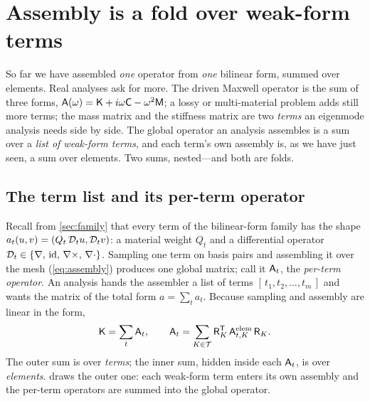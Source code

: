 \section{Assembly is a fold over weak-form terms}
\label{sec:fold}

So far we have assembled \emph{one} operator from \emph{one} bilinear form, summed
over elements. Real analyses ask for more. The driven Maxwell operator is the sum
of three forms, $\mathsf{A}(\omega)=\mathsf{K}+i\omega\mathsf{C}-\omega^2\mathsf{M}$; a lossy
or multi-material problem adds still more terms; the mass matrix and the stiffness
matrix are two \emph{terms} an eigenmode analysis needs side by side. The global
operator an analysis assembles is a sum over a \emph{list of weak-form terms},
and each term's own assembly is, as we have just seen, a sum over elements. Two
sums, nested---and both are folds.

\subsection{The term list and its per-term operator}

Recall from \cref{sec:family} that every term of the bilinear-form family has the
shape $a_t(u,v)=(Q_t\,\mathcal{D}_t u,\mathcal{D}_t v)$: a material weight $Q_t$ and a
differential operator $\mathcal{D}_t\in\{\nabla,\,\mathrm{id},\,\nabla\times,\,\nabla\cdot\}$.
Sampling one term on basis pairs and assembling it over the mesh
(\cref{eq:assembly}) produces one global matrix; call it $\mathsf{A}_t$, the
\emph{per-term operator}. An analysis hands the assembler a list of terms
$[\,t_1,t_2,\dots,t_m\,]$ and wants the matrix of the total form $a=\sum_t a_t$.
Because sampling and assembly are linear in the form,
\begin{equation}
\mathsf{K}=\sum_{t}\mathsf{A}_t,
\qquad
\mathsf{A}_t=\sum_{K\in\mathcal{T}}\mathsf{R}_K^{\mathsf T}\,
\mathsf{A}^{\mathrm{elem}}_{t,K}\,\mathsf{R}_K .
\label{eq:termsum}
\end{equation}
The outer sum is over \emph{terms}; the inner sum, hidden inside each
$\mathsf{A}_t$, is over \emph{elements}.  draws the outer one:
each weak-form term enters its own assembly and the per-term operators are summed
into the global operator.

